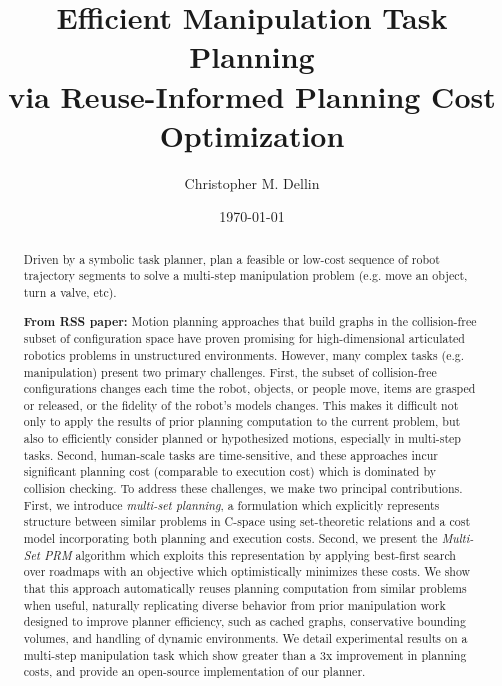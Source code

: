 \documentclass{report}
\title{Efficient Manipulation Task Planning\\
   via Reuse-Informed Planning Cost Optimization}
\author{Christopher M. Dellin}
\date{\today}
\begin{document}
\maketitle

\begin{abstract}
Driven by a symbolic task planner, plan a feasible or low-cost sequence of
robot trajectory segments to solve a multi-step manipulation problem
(e.g. move an object, turn a valve, etc).

\textbf{From RSS paper:}
Motion planning approaches that build graphs
in the collision-free subset of configuration space
have proven promising
for high-dimensional articulated robotics problems
in unstructured environments.
However, many complex tasks (e.g. manipulation)
present two primary challenges.
First, the subset of collision-free configurations changes each time
the robot, objects, or people move, items are grasped or released,
or the fidelity of the robot's models changes.
This makes it difficult not only to apply the results of prior
planning computation to the current problem,
but also to efficiently consider planned or hypothesized motions,
especially in multi-step tasks.
Second, human-scale tasks are time-sensitive,
and these approaches incur significant planning cost
(comparable to execution cost)
which is dominated by collision checking.
To address these challenges,
we make two principal contributions.
First, we introduce \emph{multi-set planning},
a formulation which explicitly represents structure
between similar problems in C-space
using set-theoretic relations
and a cost model incorporating both planning and execution costs.
Second, we present the \emph{Multi-Set PRM} algorithm
which exploits this representation
by applying best-first search over roadmaps
with an objective which optimistically minimizes these costs.
We show that this approach automatically reuses planning computation
from similar problems when useful,
naturally replicating diverse behavior from prior
manipulation work designed to improve planner efficiency,
such as cached graphs, conservative bounding volumes,
and handling of dynamic environments.
We detail experimental results on a multi-step
manipulation task which show greater than a 3x improvement
in planning costs,
and provide an open-source implementation of our planner.
\end{abstract}

\tableofcontents
\end{document}
